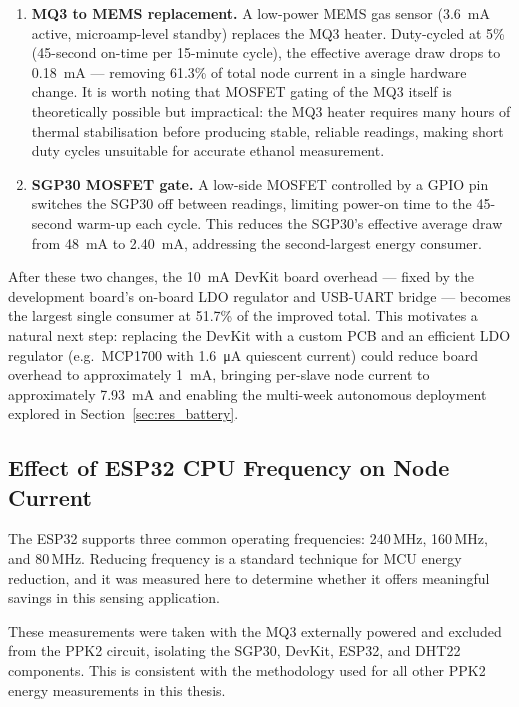 \begin{enumerate}
    \item \textbf{MQ3 to MEMS replacement.} A low-power MEMS gas sensor (\SI{3.6}{\milli\ampere} active, microamp-level standby) replaces the MQ3 heater. Duty-cycled at 5\% (45-second on-time per 15-minute cycle), the effective average draw drops to \SI{0.18}{\milli\ampere} --- removing 61.3\% of total node current in a single hardware change. It is worth noting that MOSFET gating of the MQ3 itself is theoretically possible but impractical: the MQ3 heater requires many hours of thermal stabilisation before producing stable, reliable readings, making short duty cycles unsuitable for accurate ethanol measurement.
    \item \textbf{SGP30 MOSFET gate.} A low-side MOSFET controlled by a GPIO pin switches the SGP30 off between readings, limiting power-on time to the 45-second warm-up each cycle. This reduces the SGP30's effective average draw from \SI{48}{\milli\ampere} to \SI{2.40}{\milli\ampere}, addressing the second-largest energy consumer.
\end{enumerate}

After these two changes, the \SI{10}{\milli\ampere} DevKit board overhead --- fixed by the development board's on-board LDO regulator and USB-UART bridge --- becomes the largest single consumer at 51.7\% of the improved total. This motivates a natural next step: replacing the DevKit with a custom PCB and an efficient LDO regulator (e.g.\ MCP1700 with \SI{1.6}{\micro\ampere} quiescent current) could reduce board overhead to approximately \SI{1}{\milli\ampere}, bringing per-slave node current to approximately \SI{7.93}{\milli\ampere} and enabling the multi-week autonomous deployment explored in Section~\ref{sec:res_battery}.

\subsection{Effect of ESP32 CPU Frequency on Node Current}\label{subsec:res_cpu_freq}

The ESP32 supports three common operating frequencies: 240\,MHz, 160\,MHz, and 80\,MHz. Reducing frequency is a standard technique for MCU energy reduction, and it was measured here to determine whether it offers meaningful savings in this sensing application.

These measurements were taken with the MQ3 externally powered and excluded from the PPK2 circuit, isolating the SGP30, DevKit, ESP32, and DHT22 components. This is consistent with the methodology used for all other PPK2 energy measurements in this thesis.

